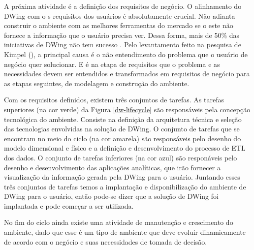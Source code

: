 A próxima atividade é a definição dos requisitos de negócio. O alinhamento do DWing com o s requisitos dos usuários é absolutamente crucial. Não adianta construir o ambiente com as melhores ferramentas do mercado se o este não fornece a informação que o usuário precisa ver. Dessa forma, mais de 50\% das iniciativas de DWing não tem sucesso \cite{sen2011}. Pelo levantamento feito na pesquisa de Kimpel (\citeyear{kimpel2013}), a principal causa é o não entendimento do problema que o usuário de negócio quer solucionar. E é na etapa de requisitos que o problema e as necessidades devem ser entendidos e transformados em requisitos de negócio para as etapas seguintes, de modelagem e construção do ambiente.

%

Com os requisitos definidos, existem três conjuntos de tarefas. As tarefas superiores (na cor verde) da Figura \ref{dw-lifecycle} são responsáveis pela concepção tecnológica do ambiente. Consiste na definição da arquitetura técnica e  seleção das tecnologias envolvidas na solução de DWing. O conjunto de tarefas que se encontram no meio do ciclo (na cor amarela) são responsáveis pelo desenho do modelo dimensional e físico e a definição e desenvolvimento do processo de ETL dos dados. O conjunto de tarefas inferiores (na cor  azul) são responáveis pelo desenho e desenvolvimento das aplicações analíticas, que irão fornecer a visualização da informação gerada pela DWing para o usuário. Juntando esses três conjuntos de tarefas temos a implantação e disponibilização do ambiente de DWing para o usuário, então pode-se dizer que a solução de DWing foi implantada e pode começar a ser utilizada. 

%

No fim do ciclo ainda existe uma atividade de manutenção e crescimento do ambiente, dado que esse é um tipo de ambiente que deve evoluir dinamicamente de acordo com o negócio e suas necessidades de tomada de decisão.
